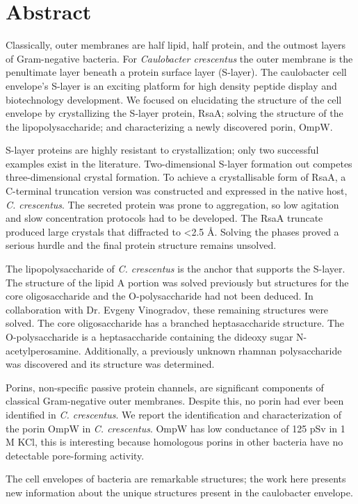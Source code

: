
\chapter{Abstract}

Classically, outer membranes are half lipid, half protein, and the outmost layers of Gram-negative bacteria. For \textit{Caulobacter crescentus} the outer membrane is the penultimate layer beneath a protein surface layer (S-layer). The caulobacter cell envelope's S-layer is an exciting platform for high density peptide display and biotechnology development. We focused on elucidating the structure of the cell envelope by crystallizing the S-layer protein, RsaA; solving the structure of the the lipopolysaccharide; and characterizing a newly discovered porin, OmpW. 

S-layer proteins are highly resistant to crystallization; only two successful examples exist in the literature. Two-dimensional S-layer formation out competes three-dimensional crystal formation. To achieve a crystallisable form of RsaA, a C-terminal truncation version was constructed and expressed in the native host, \textit{C. crescentus}. The secreted protein was prone to aggregation, so low agitation and slow concentration protocols had to be developed. The RsaA truncate produced large crystals that diffracted to <2.5 \AA. Solving the phases proved a serious hurdle and the final protein structure remains unsolved.

The lipopolysaccharide of \textit{C. crescentus} is the anchor that supports the
S-layer. The structure of the lipid A portion was solved previously but
structures for the core oligosaccharide and the O-polysaccharide had not been deduced. In collaboration with Dr. Evgeny
Vinogradov, these remaining structures were solved.
The core oligosaccharide has a branched heptasaccharide structure. The O-polysaccharide is a heptasaccharide containing the dideoxy sugar N-acetylperosamine. Additionally, a previously unknown rhamnan polysaccharide was discovered and its structure was determined. 

Porins, non-specific passive protein channels, are significant components of classical Gram-negative outer membranes. Despite this, no porin had ever been identified in \textit{C. crescentus}. We report the identification and characterization of the porin OmpW in \textit{C. crescentus}.  OmpW has low conductance of 125 pSv in 1 M KCl, this is interesting because homologous porins in other bacteria have no detectable pore-forming activity.

The cell envelopes of bacteria are remarkable structures; the work here presents new information about the unique structures present in the caulobacter envelope. 
